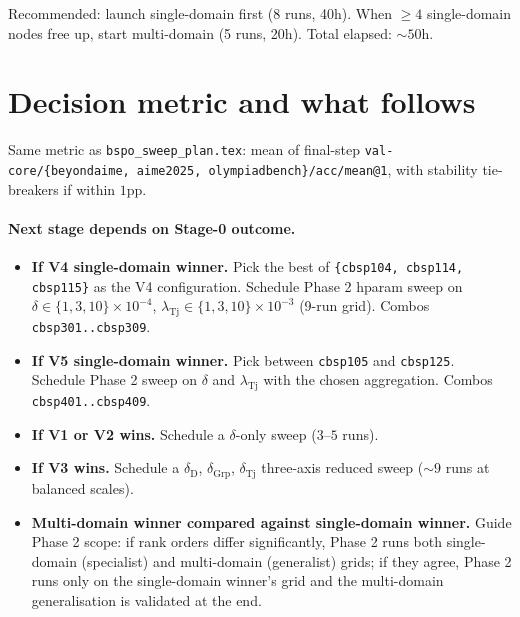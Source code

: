 \documentclass[11pt]{article}
\begin{document}
Recommended: launch single-domain first (8 runs, 40h). When $\geq 4$
single-domain nodes free up, start multi-domain (5 runs, 20h). Total
elapsed: $\sim 50$h.

\section{Decision metric and what follows}

Same metric as \texttt{bspo\_sweep\_plan.tex}: mean of final-step
\verb|val-core/{beyondaime, aime2025, olympiadbench}/acc/mean@1|, with
stability tie-breakers if within $1$pp.

\paragraph{Next stage depends on Stage-0 outcome.}
\begin{itemize}
\item \textbf{If V4 single-domain winner.} Pick the best of
\verb|{cbsp104, cbsp114, cbsp115}| as the V4 configuration. Schedule
Phase 2 hparam sweep on $\delta\in\{1,3,10\}\times 10^{-4}$,
$\lambda_{\text{Tj}}\in\{1,3,10\}\times 10^{-3}$ (9-run grid). Combos
\verb|cbsp301..cbsp309|.
\item \textbf{If V5 single-domain winner.} Pick between
\verb|cbsp105| and \verb|cbsp125|. Schedule Phase 2 sweep on
$\delta$ and $\lambda_{\text{Tj}}$ with the chosen aggregation. Combos
\verb|cbsp401..cbsp409|.
\item \textbf{If V1 or V2 wins.} Schedule a $\delta$-only sweep
($3$--$5$ runs).
\item \textbf{If V3 wins.} Schedule a $\delta_{\text{D}}$,
$\delta_{\operatorname{Grp}}$, $\delta_{\operatorname{Tj}}$ three-axis
reduced sweep ($\sim 9$ runs at balanced scales).
\item \textbf{Multi-domain winner compared against single-domain winner.}
Guide Phase 2 scope: if rank orders differ significantly, Phase 2 runs
both single-domain (specialist) and multi-domain (generalist) grids; if
they agree, Phase 2 runs only on the single-domain winner's grid and the
multi-domain generalisation is validated at the end.
\end{itemize}
\end{document}
